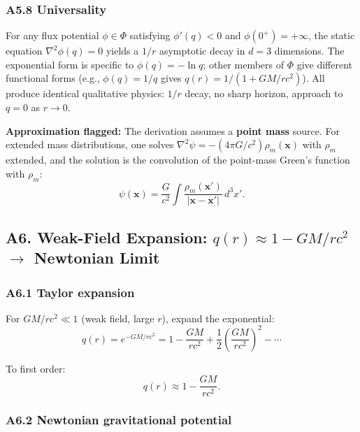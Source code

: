 \documentclass[reprint]{revtex4-2}
\begin{document}
\subsubsection{A5.8 Universality}

For any flux potential $\phi\in\Phi$ satisfying $\phi'(q)<0$ and $\phi(0^+)=+\infty$, the static equation $\nabla^2\phi(q)=0$ yields a $1/r$ asymptotic decay in $d=3$ dimensions. The exponential form is specific to $\phi(q)=-\ln q$; other members of $\Phi$ give different functional forms (e.g., $\phi(q)=1/q$ gives $q(r)=1/(1+GM/rc^2)$). All produce identical qualitative physics: $1/r$ decay, no sharp horizon, approach to $q=0$ as $r\to 0$.

\textbf{Approximation flagged:} The derivation assumes a \textbf{point mass} source. For extended mass distributions, one solves $\nabla^2\psi = -(4\pi G/c^2)\rho_m(\mathbf{x})$ with $\rho_m$ extended, and the solution is the convolution of the point-mass Green's function with $\rho_m$:
\begin{equation}
\psi(\mathbf{x}) = \frac{G}{c^2}\int \frac{\rho_m(\mathbf{x}')}{|\mathbf{x}-\mathbf{x}'|}\,d^3x'.
\end{equation}

\subsection{A6. Weak-Field Expansion: $q(r)\approx 1-GM/rc^2$ $\to$ Newtonian Limit}

\subsubsection{A6.1 Taylor expansion}

For $GM/rc^2 \ll 1$ (weak field, large $r$), expand the exponential:
\begin{equation}
q(r) = e^{-GM/rc^2} = 1 - \frac{GM}{rc^2} + \frac{1}{2}\left(\frac{GM}{rc^2}\right)^2 - \cdots
\end{equation}

To first order:
\begin{equation}
\boxed{q(r) \approx 1 - \frac{GM}{rc^2}}.
\label{eq:weak_field}
\end{equation}

\subsubsection{A6.2 Newtonian gravitational potential}
\end{document}
